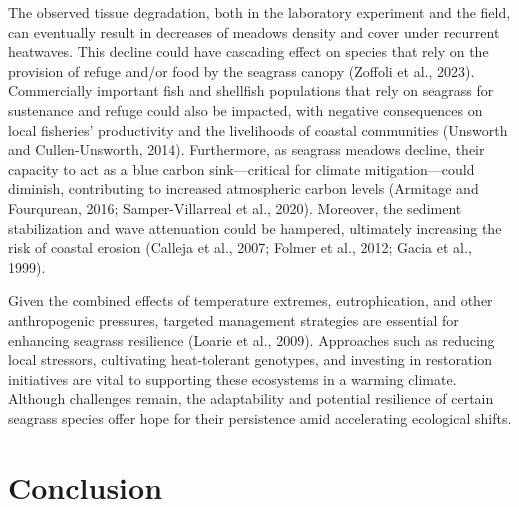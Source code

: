 \documentclass[
  letterpaper,
  11pt,
  english,
  singlespacing,
  headsepline]{MastersDoctoralThesis}
\begin{document}
\begin{spacing}{1.5}
The observed tissue degradation, both in the laboratory experiment and
the field, can eventually result in decreases of meadows density and
cover under recurrent heatwaves. This decline could have cascading
effect on species that rely on the provision of refuge and/or food by
the seagrass canopy (Zoffoli et al., 2023). Commercially important fish
and shellfish populations that rely on seagrass for sustenance and
refuge could also be impacted, with negative consequences on local
fisheries' productivity and the livelihoods of coastal communities
(Unsworth and Cullen-Unsworth, 2014). Furthermore, as seagrass meadows
decline, their capacity to act as a blue carbon sink---critical for
climate mitigation---could diminish, contributing to increased
atmospheric carbon levels (Armitage and Fourqurean, 2016;
Samper-Villarreal et al., 2020). Moreover, the sediment stabilization
and wave attenuation could be hampered, ultimately increasing the risk
of coastal erosion (Calleja et al., 2007; Folmer et al., 2012; Gacia et
al., 1999).

Given the combined effects of temperature extremes, eutrophication, and
other anthropogenic pressures, targeted management strategies are
essential for enhancing seagrass resilience (Loarie et al., 2009).
Approaches such as reducing local stressors, cultivating heat-tolerant
genotypes, and investing in restoration initiatives are vital to
supporting these ecosystems in a warming climate. Although challenges
remain, the adaptability and potential resilience of certain seagrass
species offer hope for their persistence amid accelerating ecological
shifts.

\section{Conclusion}\label{conclusion-2}


\end{spacing}
\end{document}
